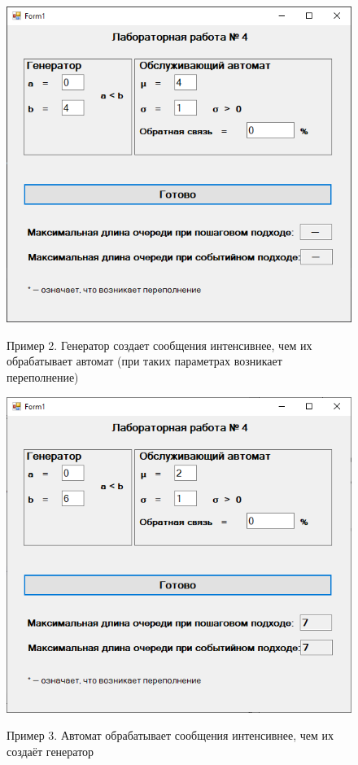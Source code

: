 \begin{figure}[h]
	\begin{center}
		{\includegraphics[scale = 0.7]{img/ex2.png}}
		\caption{Пример 2. Генератор создает сообщения интенсивнее, чем их обрабатывает автомат (при таких параметрах возникает переполнение)}
		\label{fig2:image}
	\end{center}
\end{figure}
\newpage

\begin{figure}[h!]
	\begin{center}
		{\includegraphics[scale = 0.7]{img/ex3.png}}
		\caption{Пример 3. Автомат обрабатывает сообщения интенсивнее, чем их создаёт генератор}
		\label{fig3:image}
	\end{center}
\end{figure}
\newpage

